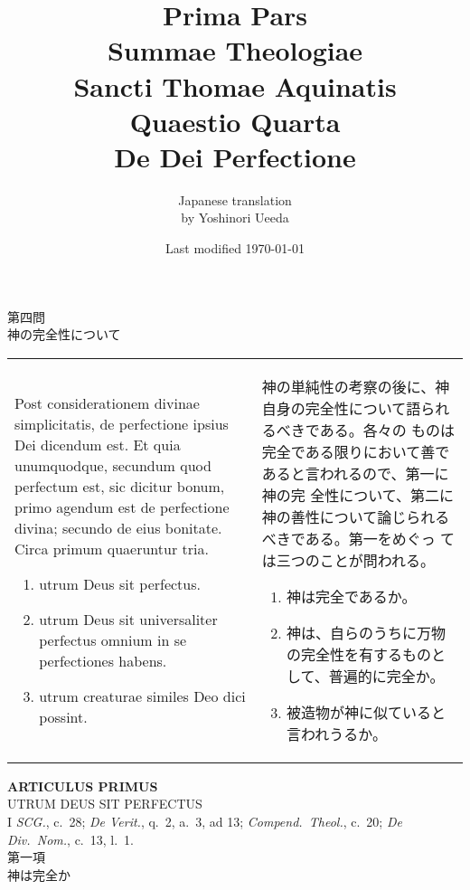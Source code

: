 \documentclass[10pt]{jsarticle} %
\title{{\bf Prima Pars}\\{\HUGE Summae Theologiae}\\Sancti Thomae
Aquinatis\\Quaestio Quarta\\{\bf De Dei Perfectione}}
\author{Japanese translation\\by Yoshinori {\sc Ueeda}}
\date{Last modified \today}
\begin{document}
\maketitle
\begin{center}
 {\Large 第四問\\神の完全性について}
\end{center}

\begin{longtable}{p{21em}p{21em}}
Post considerationem divinae simplicitatis, de perfectione ipsius Dei
 dicendum est. Et quia unumquodque, secundum quod perfectum est, sic
 dicitur bonum, primo agendum est de perfectione divina; secundo de eius
 bonitate. Circa primum quaeruntur tria. 
\begin{enumerate}
 \item utrum Deus sit perfectus.
 \item utrum Deus sit universaliter perfectus omnium in se
 perfectiones habens.
 \item utrum creaturae similes Deo dici possint.
\end{enumerate}

&

神の単純性の考察の後に、神自身の完全性について語られるべきである。各々の
 ものは完全である限りにおいて善であると言われるので、第一に神の完
 全性について、第二に神の善性について論じられるべきである。第一をめぐっ
 ては三つのことが問われる。
\begin{enumerate}
 \item 神は完全であるか。
 \item 神は、自らのうちに万物の完全性を有するものとして、普遍的に完全か。
 \item 被造物が神に似ていると言われうるか。
\end{enumerate}

\end{longtable}

\newpage
{}
\begin{center}
 {\Large {\bf ARTICULUS PRIMUS}}\\
 {\large UTRUM DEUS SIT PERFECTUS}\\
 {\footnotesize I {\itshape SCG.}, c.~28; {\itshape De Verit.}, q.~2,
 a.~3, ad 13; {\itshape Compend.~Theol.}, c.~20; {\itshape De
 Div.~Nom.}, c.~13, l.~1.}\\
 {\Large 第一項\\神は完全か}
\end{center}
\end{document}

